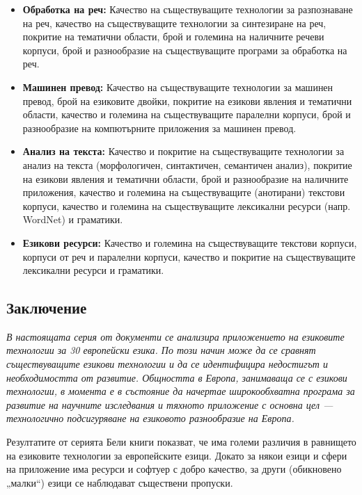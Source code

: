 \documentclass[]{../../metanetpaper}
\begin{document}
\begin{multicols}{2}
\begin{itemize}
\item \textbf{Обработка на реч:} Качество на съществуващите технологии
  за разпознаване на реч, качество на съществуващите технологии за
  синтезиране на реч, покритие на тематични области, брой и големина
  на наличните речеви корпуси, брой и разнообразие на съществуващите
  програми за обработка на реч.
\item \textbf{Машинен превод:} Качество на съществуващите технологии
  за машинен превод, брой на езиковите двойки, покритие на езикови
  явления и тематични области, качество и големина на съществуващите
  паралелни корпуси, брой и разнообразие на компютърните приложения за
  машинен превод.
\item \textbf{Анализ на текста:} Качество и покритие на съществуващите
  технологии за анализ на текста (морфологичен, синтактичен,
  семантичен анализ), покритие на езикови явления и тематични области,
  брой и разнообразие на наличните приложения, качество и големина на
  съществуващите (анотирани) текстови корпуси, качество и големина на
  съществуващите лексикални ресурси (напр. WordNet) и граматики.
\item \textbf{Езикови ресурси:} Качество и големина на съществуващите
  текстови корпуси, корпуси от реч и паралелни корпуси, качество и
  покритие на съществуващите лексикални ресурси и граматики.
\end{itemize} 

\subsection{Заключение}

\emph{В настоящата серия от документи се анализира приложението на
  езиковите технологии за 30 европейски езика. По този начин може да
  се сравнят съществуващите езикови технологии и да се идентифицира
  недостигът и необходимостта от развитие. Общността в Европа,
  занимаваща се с езикови технологии, в момента е в състояние да
  начертае широкообхватна програма за развитие на научните изследвания
  и тяхното приложение с основна цел — технологично подсигуряване на
  езиковото разнообразие на Европа.}

Резултатите от серията Бели книги показват, че има големи различия в равнището на езиковите технологии
за европейските езици. Докато за някои езици и сфери на приложение има
ресурси и софтуер с добро качество, за други (обикновено „малки“)
езици се наблюдават съществени пропуски.


\end{multicols}
\end{document}
